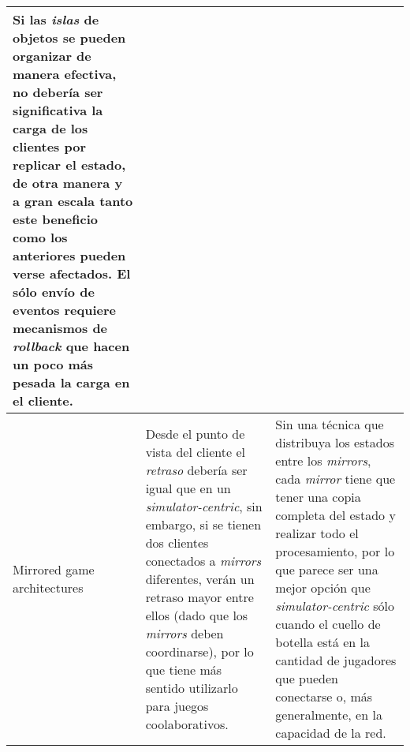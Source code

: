 \begin{longtable}{|p{3cm}|p{6cm}|p{6cm}|}
Si las \emph{islas} de objetos se pueden organizar de manera efectiva, no debería ser significativa la carga de los clientes por replicar el estado, de otra manera y a gran escala tanto este beneficio como los anteriores pueden verse afectados. \newline El sólo envío de eventos requiere mecanismos de \emph{rollback} que hacen un poco más pesada la carga en el cliente. \\
\hline
Mirrored game architectures &
Desde el punto de vista del cliente el \emph{retraso} debería ser igual que en un \emph{simulator-centric}, sin embargo, si se tienen dos clientes conectados a \emph{mirrors} diferentes, verán un retraso mayor entre ellos (dado que los \emph{mirrors} deben coordinarse), por lo que tiene más sentido utilizarlo para juegos coolaborativos.  &
Sin una técnica que distribuya los estados entre los \emph{mirrors}, cada \emph{mirror} tiene que tener una copia completa del estado y realizar todo el procesamiento, por lo que parece ser una mejor opción que \emph{simulator-centric} sólo cuando el cuello de botella está en la cantidad de jugadores que pueden conectarse o, más generalmente, en la capacidad de la red.\\
\hline
\end{longtable}
\normalsize


